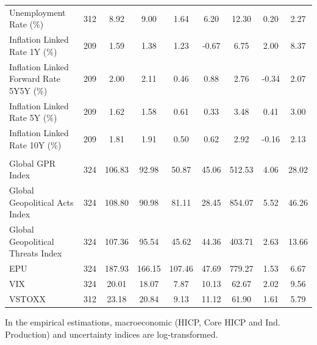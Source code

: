 \begin{table}[t]
\begin{tabular*}{0.9\linewidth}{@{\extracolsep{\fill}}lcccccccc}
Unemployment Rate (\%) & 312 & 8.92 & 9.00 & 1.64 & 6.20 & 12.30 & 0.20 & 2.27 \\ 
Inflation Linked Rate 1Y (\%) & 209 & 1.59 & 1.38 & 1.23 & -0.67 & 6.75 & 2.00 & 8.37 \\ 
Inflation Linked Forward Rate 5Y5Y (\%) & 209 & 2.00 & 2.11 & 0.46 & 0.88 & 2.76 & -0.34 & 2.07 \\ 
Inflation Linked Rate 5Y (\%) & 209 & 1.62 & 1.58 & 0.61 & 0.33 & 3.48 & 0.41 & 3.00 \\ 
Inflation Linked Rate 10Y (\%) & 209 & 1.81 & 1.91 & 0.50 & 0.62 & 2.92 & -0.16 & 2.13 \\ 
\midrule\addlinespace[2.5pt]
\multicolumn{9}{>{\raggedright\arraybackslash}m{0.9\linewidth}}{\parbox{\linewidth}{Uncertainty \& Risk Indices}} \\[2.5pt] 
\midrule\addlinespace[2.5pt]
Global GPR Index & 324 & 106.83 & 92.98 & 50.87 & 45.06 & 512.53 & 4.06 & 28.02 \\ 
Global Geopolitical Acts Index & 324 & 108.80 & 90.98 & 81.11 & 28.45 & 854.07 & 5.52 & 46.26 \\ 
Global Geopolitical Threats Index & 324 & 107.36 & 95.54 & 45.62 & 44.36 & 403.71 & 2.63 & 13.66 \\ 
EPU & 324 & 187.93 & 166.15 & 107.46 & 47.69 & 779.27 & 1.53 & 6.67 \\ 
VIX & 324 & 20.01 & 18.07 & 7.87 & 10.13 & 62.67 & 2.02 & 9.56 \\ 
VSTOXX & 312 & 23.18 & 20.84 & 9.13 & 11.12 & 61.90 & 1.61 & 5.79 \\ 
\bottomrule
\end{tabular*}
\begin{minipage}{\linewidth}
\vspace{.05em}
In the empirical estimations, macroeconomic (HICP, Core HICP and Ind. Production) and uncertainty indices are log-transformed.\\
\end{minipage}
\end{table}

